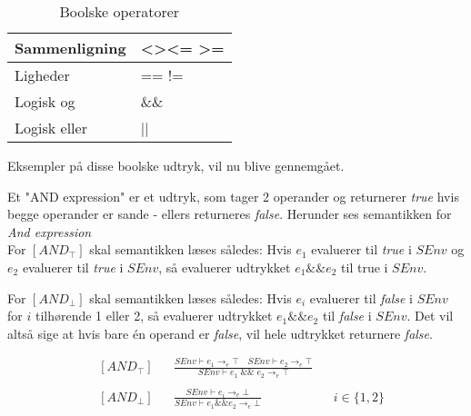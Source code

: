\begin{table}[H]
    \centering
    \begin{tabular}{|l|l|}
        \hline
        \centering

        Sammenligning      & \textless \quad \textgreater \quad \textless= \quad\textgreater= \\ \hline
        Ligheder           & == \quad !=                                                      \\ \hline
        Logisk og          & \&\&                                                              \\ \hline
        Logisk eller       & ||                                                               \\ \hline


    \end{tabular}
    \caption{Boolske operatorer}
    \label{tab:operatorerbool}
\end{table}

\noindent Eksempler på disse boolske udtryk, vil nu blive gennemgået.

\noindent Et "AND expression"\mbox{} er et udtryk, som tager 2 operander og returnerer \textit{true} hvis begge operander er sande - ellers returneres \textit{false}. Herunder ses semantikken for \textit{And expression}\\

\noindent For $[AND_\top]$ skal semantikken læses således: Hvis $e_1$ evaluerer til \textit{true} i $SEnv$ og $e_2$ evaluerer til \textit{true} i $SEnv$, så evaluerer udtrykket $e_1 \&\& e_2$ til true i $SEnv$. 

For $[AND_\bot]$ skal semantikken læses således: Hvis $e_i$ evaluerer til \textit{false} i $SEnv$  for $i$ tilhørende 1 eller 2, så evaluerer udtrykket $e_1  \&\& e_2$ til \textit{false} i $SEnv$. Det vil altså sige at hvis bare én operand er \textit{false}, vil hele udtrykket returnere \textit{false}.

\begin{align*}
&[AND_\top] & &\frac{SEnv \vdash e_1 \rightarrow_e \top \quad SEnv \vdash e_2 \rightarrow_e \top}{SEnv \vdash e_1\; \&\&\; e_2 \rightarrow_e \top}\\\\
&[AND_\bot] & &\frac{SEnv \vdash e_i \rightarrow_e \bot}{SEnv \vdash e_1 \&\& e_2 \rightarrow_e \bot} & &i \in \{1, 2\}\\\\
\end{align*}        



